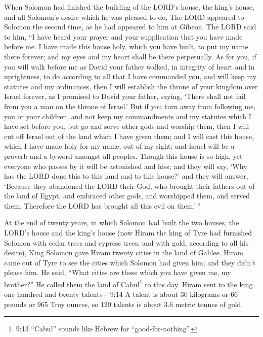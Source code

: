  When Solomon had finished the building of the LORD's house,
the king's house, and all Solomon's desire which he was pleased to do,
 The LORD appeared to Solomon the second time, as he had
appeared to him at Gibeon.  The LORD said to him, ``I have
heard your prayer and your supplication that you have made before me. I
have made this house holy, which you have built, to put my name there
forever; and my eyes and my heart shall be there perpetually.
 As for you, if you will walk before me as David your father
walked, in integrity of heart and in uprightness, to do according to all
that I have commanded you, and will keep my statutes and my ordinances,
 then I will establish the throne of your kingdom over
Israel forever, as I promised to David your father, saying, `There shall
not fail from you a man on the throne of Israel.'  But if
you turn away from following me, you or your children, and not keep my
commandments and my statutes which I have set before you, but go and
serve other gods and worship them,  then I will cut off
Israel out of the land which I have given them; and I will cast this
house, which I have made holy for my name, out of my sight; and Israel
will be a proverb and a byword amongst all peoples.  Though
this house is so high, yet everyone who passes by it will be astonished
and hiss; and they will say, `Why has the LORD done this to this land
and to this house?'  and they will answer, `Because they
abandoned the LORD their God, who brought their fathers out of the land
of Egypt, and embraced other gods, and worshipped them, and served them.
Therefore the LORD has brought all this evil on them.'\,''

 At the end of twenty years, in which Solomon had built the
two houses, the LORD's house and the king's house  (now
Hiram the king of Tyre had furnished Solomon with cedar trees and
cypress trees, and with gold, according to all his desire), King Solomon
gave Hiram twenty cities in the land of Galilee.  Hiram
came out of Tyre to see the cities which Solomon had given him; and they
didn't please him.  He said, ``What cities are these which
you have given me, my brother?'' He called them the land of
Cabul\footnote{9:13 ``Cabul'' sounds like Hebrew for
  ``good-for-nothing''.} to this day.  Hiram sent to the
king one hundred and twenty talents+ 9:14 A talent is about 30 kilograms
or 66 pounds or 965 Troy ounces, so 120 talents is about 3.6 metric
tonnes of gold.

